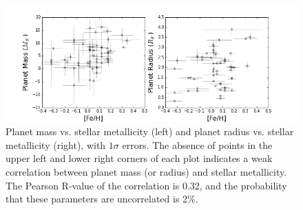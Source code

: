 \documentclass[11pt]{aastex}
\newcommand{\rspecial}{4 \rearth}
\begin{document}
\begin{figure}[htbp] %
   \centering
      \includegraphics[width=6in]{m_fe.png} 
   \caption{Planet mass vs. stellar metallicity (left) and planet radius vs. stellar metallicity (right), with $1\sigma$ errors.  The absence of points in the upper left and lower right corners of each plot indicates a weak correlation between planet mass (or radius) and stellar metallicity.  The Pearson R-value of the correlation is 0.32, and the probability that these parameters are uncorrelated is 2\%.}
\end{figure}

\clearpage

{}

\end{document}
